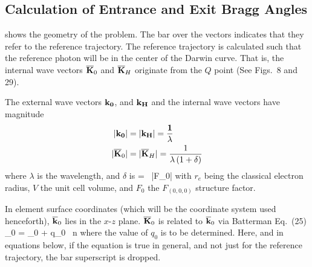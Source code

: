 \subsection{Calculation of Entrance and Exit Bragg Angles}
\label{ss:crystal.ref}

 shows the geometry of the
problem. The bar over the vectors indicates that they refer to the
reference trajectory. The reference trajectory is calculated such that
the reference photon will be in the center of the Darwin curve. That
is, the internal wave vectors $\overline{{\bf K}}_0$ and $\overline{{\bf K}}_H$ originate
from the $Q$ point (See \cite{b:batterman} Figs.~8 and 29).

The external wave vectors $\bf k_0$, and $\bf k_H$ and the internal wave vectors
have magnitude
\begin{align}
  |\bf k_0| &= |\bf k_H| = \frac{1}{\lambda} 
  \label{kk1l1} \\
  |\overline{{\bf K}}_0| &= |\overline{{\bf K}}_H| = \frac{1}{\lambda \, (1 + \delta)}
  \label{kk1l2}
\end{align}
where $\lambda$ is the wavelength, and $\delta$ is
\Begineq
  \delta =  \, |F_0|
\Endeq
with $r_e$ being the classical electron radius, $V$ the unit cell
volume, and $F_0$ the $F_{(0,0,0)}$ structure factor. 

In element surface coordinates (which will be the coordinate system used
henceforth), $\overline{{\bf k}}_0$ lies in the $x$-$z$ plane. $\overline{{\bf K}}_0$ is
related to $\overline{{\bf k}}_0$ via Batterman Eq.~(25)
\Begineq
  \bfK_0 = \bfk_0 + q_0 \, \bfhat n
  \label{kkqn1}
\Endeq
where the value of $q_0$ is to be determined. Here, and in equations
below, if the equation is true in general, and not just for the
reference trajectory, the bar superscript is dropped.

